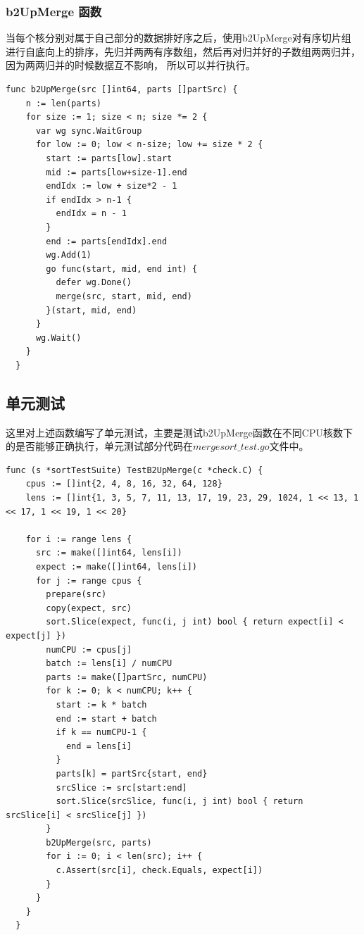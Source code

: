 \documentclass[UTF8]{ctexart}
\begin{document}
\subsubsection{b2UpMerge 函数}
当每个核分别对属于自己部分的数据排好序之后，使用b2UpMerge对有序切片组进行自底向上的排序，先归并两两有序数组，然后再对归并好的子数组两两归并，因为两两归并的时候数据互不影响，
所以可以并行执行。
\begin{lstlisting}[language=Golang]
  func b2UpMerge(src []int64, parts []partSrc) {
    n := len(parts)
    for size := 1; size < n; size *= 2 {
      var wg sync.WaitGroup
      for low := 0; low < n-size; low += size * 2 {
        start := parts[low].start
        mid := parts[low+size-1].end
        endIdx := low + size*2 - 1
        if endIdx > n-1 {
          endIdx = n - 1
        }
        end := parts[endIdx].end
        wg.Add(1)
        go func(start, mid, end int) {
          defer wg.Done()
          merge(src, start, mid, end)
        }(start, mid, end)
      }
      wg.Wait()
    }
  }
\end{lstlisting}

\subsection{单元测试}
这里对上述函数编写了单元测试，主要是测试b2UpMerge函数在不同CPU核数下的是否能够正确执行，单元测试部分代码在$mergesort\_test.go$文件中。
\begin{lstlisting}[language=Golang]
  func (s *sortTestSuite) TestB2UpMerge(c *check.C) {
    cpus := []int{2, 4, 8, 16, 32, 64, 128}
    lens := []int{1, 3, 5, 7, 11, 13, 17, 19, 23, 29, 1024, 1 << 13, 1 << 17, 1 << 19, 1 << 20}
  
    for i := range lens {
      src := make([]int64, lens[i])
      expect := make([]int64, lens[i])
      for j := range cpus {
        prepare(src)
        copy(expect, src)
        sort.Slice(expect, func(i, j int) bool { return expect[i] < expect[j] })
        numCPU := cpus[j]
        batch := lens[i] / numCPU
        parts := make([]partSrc, numCPU)
        for k := 0; k < numCPU; k++ {
          start := k * batch
          end := start + batch
          if k == numCPU-1 {
            end = lens[i]
          }
          parts[k] = partSrc{start, end}
          srcSlice := src[start:end]
          sort.Slice(srcSlice, func(i, j int) bool { return srcSlice[i] < srcSlice[j] })
        }
        b2UpMerge(src, parts)
        for i := 0; i < len(src); i++ {
          c.Assert(src[i], check.Equals, expect[i])
        }
      }
    }
  }
\end{lstlisting}
\end{document}
